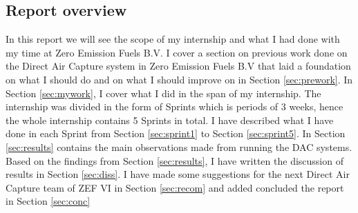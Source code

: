 \subsection{Report overview}

In this report we will see the scope of my internship and what I had done with my time at Zero Emission Fuels B.V. I cover a section on previous work done on the Direct Air Capture system in Zero Emission Fuels B.V that laid a foundation on what I should do and on what I should improve on in Section \ref{sec:prework}. In Section \ref{sec:mywork}, I cover what I did in the span of my internship. The internship was divided in the form of Sprints which is periods of 3 weeks, hence the whole internship contains 5 Sprints in total. I have described what I have done in each Sprint from Section \ref{sec:sprint1} to Section \ref{sec:sprint5}. In Section \ref{sec:results} contains the main observations made from running the DAC systems. Based on the findings from Section \ref{sec:results}, I have written the discussion of results in Section \ref{sec:diss}. I have made some suggestions for the next Direct Air Capture team of ZEF VI in Section \ref{sec:recom} and added concluded the report in Section \ref{sec:conc}